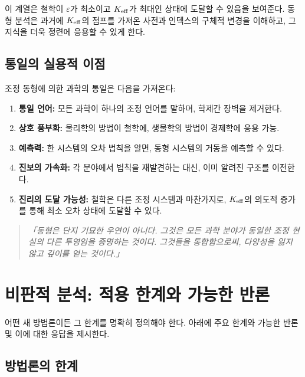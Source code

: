 \documentclass[11pt,a4paper]{article}
\newcommand{\eps}{\varepsilon}
\begin{document}
	이 계열은 철학이 \(\eps\)가 최소이고 \(\Keff\)가 최대인 상태에 도달할 수 있음을 보여준다. 동형 분석은 과거에 \(\Keff\)의 점프를 가져온 사전과 인덱스의 구체적 변경을 이해하고, 그 지식을 더욱 정련에 응용할 수 있게 한다.
	
	\subsection{통일의 실용적 이점}
	
	조정 동형에 의한 과학의 통일은 다음을 가져온다:
	
	\begin{enumerate}
		\item \textbf{통일 언어:} 모든 과학이 하나의 조정 언어를 말하며, 학제간 장벽을 제거한다.
		\item \textbf{상호 풍부화:} 물리학의 방법이 철학에, 생물학의 방법이 경제학에 응용 가능.
		\item \textbf{예측력:} 한 시스템의 오차 법칙을 알면, 동형 시스템의 거동을 예측할 수 있다.
		\item \textbf{진보의 가속화:} 각 분야에서 법칙을 재발견하는 대신, 이미 알려진 구조를 이전한다.
		\item \textbf{진리의 도달 가능성:} 철학은 다른 조정 시스템과 마찬가지로, \(\Keff\)의 의도적 증가를 통해 최소 오차 상태에 도달할 수 있다.
	\end{enumerate}
	
	\begin{quote}
		\itshape
		「동형은 단지 기묘한 우연이 아니다. 그것은 모든 과학 분야가 동일한 조정 현실의 다른 투영임을 증명하는 것이다. 그것들을 통합함으로써, 다양성을 잃지 않고 깊이를 얻는 것이다.」
	\end{quote}
	
	
	\section{비판적 분석: 적용 한계와 가능한 반론}
	\label{sec:critical-analysis}
	
	어떤 새 방법론이든 그 한계를 명확히 정의해야 한다. 아래에 주요 한계와 가능한 반론 및 이에 대한 응답을 제시한다.
	
	\subsection{방법론의 한계}
	
\end{document}
